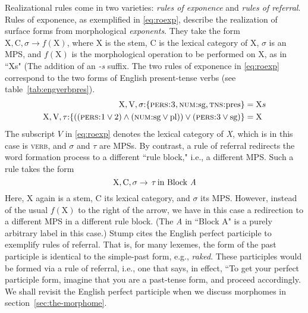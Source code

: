 Realizational rules come in two varieties:
\emph{rules of exponence} and \emph{rules of referral}. Rules of exponence, as exemplified in \eqref{eq:roexp}, describe the 
realization of surface forms from morphological \emph{exponents}. They take the form 
$\text{X},\text{C},\sigma \to f(\text{X})$, where X is the stem, C is the lexical category of X, 
$\sigma$ is an \ac{MPS},  and $f(\text{X})$ is the morphological operation to be performed 
on X, as in ``Xs" (The addition of an \emph{-s} suffix. The two rules of exponence in \eqref{eq:roexp}  
correspond to the two forms 
of English present-tense verbs (see table~\ref{tab:engverbpres}). 
\begin{align}
\label{eq:roexp}
	\text{X},\text{V},\sigma\text{:}\{ \textsc{pers:3}\text{,} \, \textsc{num:}\text{sg,} \, \textsc{tns:}\text{pres} \} &= \text{X}s \\ \label{eq:roexp1}
	\text{X},\text{V},\tau\text{:}\{((\textsc{pers:}\text{1}\vee\text{2}) \land (\textsc{num:}\text{sg}\vee\text{pl})) \vee (\textsc{pers:}3 \vee \text{sg})\} &= \text{X} 
\end{align}
The subscript $V$ in \eqref{eq:roexp} denotes the lexical category of \textit{X}, which is  
in this case is \textsc{verb}, 
and $\sigma$ and $\tau$ are \ac{MPS}s. 
By contrast, a rule of referral redirects the word formation process to a different ``rule block," i.e.,
a different \ac{MPS}. Such a rule takes the form 
\begin{equation}
\label{eq:ror}
\text{X}, \text{C}, \sigma \to \, \tau \, \text{in Block \textit{A}}
\end{equation}
Here, X again is a stem, 
C its lexical category, and $\sigma$ its MPS. However, instead of the usual $f(\text{X})$ 
to the right of the arrow, we have in this case a redirection to a 
different \ac{MPS} in a different rule block. (The \textit{A} in ``Block A" 
is a purely arbitrary label in this case.) Stump cites the English perfect participle 
to exemplify rules of referral. That is, for many lexemes, the form of the 
past participle is identical to the simple-past form, e.g., \textit{raked}. 
These participles would be formed via a rule of referral, i.e., one that 
says, in effect, ``To get your perfect participle form, imagine that you 
are a past-tense form, and proceed accordingly.  We shall revisit the English 
perfect participle when we discuss morphomes 
in section~\ref{sec:the-morphome}. 

%

